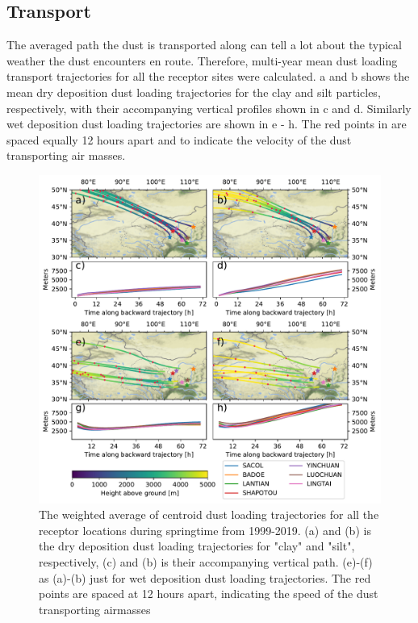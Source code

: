 \subsection{Transport}
The averaged path the dust is transported along can tell a lot about the typical weather the dust encounters en route.    
Therefore, multi-year mean dust loading transport trajectories for all the receptor sites were calculated.
a and b shows the mean dry deposition dust loading trajectories for the clay and silt particles, respectively, with their accompanying vertical profiles shown in c and d. Similarly wet deposition dust loading trajectories are shown in e - h. 
The red points in  are spaced equally 12 hours apart and to indicate the velocity of the dust transporting air masses. 
\begin{figure}[hptb]
    \centering
    \includegraphics[width=\textwidth]{texfiles/figs/average_dust_transport_trajectories.pdf}
    \caption{The weighted average of centroid dust loading trajectories for all the receptor locations during springtime from 1999-2019. (a) and (b) is the dry deposition dust loading trajectories for "clay" and "silt", respectively, (c) and (b) is their accompanying vertical path.  (e)-(f) as (a)-(b) just for wet deposition dust loading trajectories. The red points are spaced at 12 hours apart, indicating the speed of the dust transporting airmasses }
    \label{fig:dust_loading_trajecs}
\end{figure}

